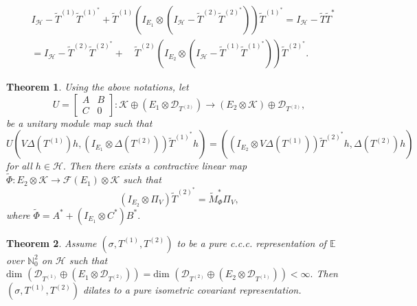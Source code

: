 \documentclass[10pt,a4paper]{amsart}
\newtheorem{theorem}{Theorem}
\newcommand{\be}{\mathbb E}
\newcommand{\ot}{\otimes}
\newcommand{\wT}{\wt{T}}
\newcommand{\wt}{\widetilde}
\begin{document}
	\begin{align}\label{BB1}
	&I_{\mathcal H}-\widetilde{T}^{(1)}\widetilde{T}^{(1)^*}+\widetilde{T}^{(1)}(I_{E_1}\otimes(I_{\mathcal{H}}-\widetilde{T}^{(2)}\widetilde{T}^{(2)^*}))\widetilde{T}^{(1)^*}=	I_{\mathcal H}-{\widetilde T}{\widetilde T^*}\\& \nonumber=I_{\mathcal H}-\widetilde{T}^{(2)}\widetilde{T}^{(2)^*}+
	\quad \widetilde{T}^{(2)}(I_{E_2}\otimes(I_{\mathcal{H}}-\widetilde{T}^{(1)}\widetilde{T}^{(1)^*}))\widetilde{T}^{(2)^*}.
	\end{align}

\begin{theorem}\label{identity}
	Using the above notations, let \begin{equation}
			\label{unitary} U = \begin{bmatrix}A&B\\C&0\end{bmatrix}:
			\mathcal{K} \oplus  (E_1 \ot\mathcal{D}_{ T^{(2)}})\to (E_2 \ot \mathcal{K}) \oplus  \mathcal{D}_{ T^{(2)}},
		\end{equation} be a unitary module map such that $$U(V\Delta(T^{(1)})h,(I_{E_1} \ot \Delta(T^{(2)}))\wT^{(1)^*}h)=((I_{E_2} \ot V\Delta(T^{(1)}))\wT^{(2)^*}h,\Delta(T^{(2)})h)$$ for all $h\in \mathcal{H}.$ Then there exists a contractive linear map $\widetilde{\Phi}:E_2\ot \mathcal{K}\to \mathcal{F}(E_1)\ot \mathcal{K}$ such that $$ (I_{E_2}\ot \Pi_V)\wT^{(2)^*}=\widetilde{M}_{\Phi}^*\Pi_V,$$ where $\widetilde{\Phi}=A^*+(I_{E_1}\ot C^*)B^*.$
	  \end{theorem}

	\begin{theorem}\label{JJ3}
	Assume $(\sigma, T^{(1)}, T^{(2)})$ to be a pure c.c.c. representation  of $\be$ over $\mathbb N^2_0$ on $\mathcal H$ such that $\mbox{dim~} (\mathcal{D}_{T^{(1)}} \oplus (E_1 \ot\mathcal{D}_{ T^{(2)}}))=\mbox{dim~} (\mathcal{D}_{ T^{(2)}}\oplus (E_2\ot \mathcal{D}_{ T^{(1)}}))< \infty.$ Then $(\sigma, T^{(1)}, T^{(2)})$ dilates to a pure isometric covariant representation.
\end{theorem}
\end{document}
